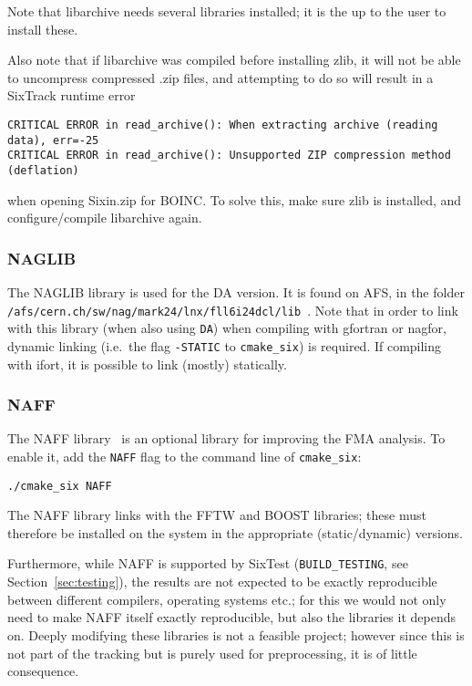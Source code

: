 \documentclass[english,BCOR=0mm,DIV=18]{scrartcl}
\begin{document}
Note that libarchive needs several libraries installed; it is the up to the user to install these.

Also note that if libarchive was compiled before installing zlib, it will not be able to uncompress compressed .zip files, and attempting to do so will result in a SixTrack runtime error
\begin{verbatim}
CRITICAL ERROR in read_archive(): When extracting archive (reading data), err=-25
CRITICAL ERROR in read_archive(): Unsupported ZIP compression method (deflation)
\end{verbatim}
when opening Sixin.zip for BOINC.
To solve this, make sure zlib is installed, and configure/compile libarchive again.

\subsubsection{NAGLIB}
\label{sec:building:libs:naglib}
The NAGLIB library  is used for the DA version.
It is found on AFS, in the folder \texttt{/afs/cern.ch/sw/nag/mark24/lnx/fll6i24dcl/lib}~.
Note that in order to link with this library (when also using \texttt{DA}) when compiling with gfortran or nagfor, dynamic linking (i.e.\ the flag \texttt{-STATIC} to \texttt{cmake\_six}) is required.
If compiling with ifort, it is possible to link (mostly) statically.

\subsubsection{NAFF}
\label{sec:building:libs:naff}
The NAFF library~\cite{NAFFpaper2} is an optional library for improving the FMA analysis.
To enable it, add the \texttt{NAFF} flag to the command line of \texttt{cmake\_six}:
\begin{lstlisting}
./cmake_six NAFF
\end{lstlisting}
The NAFF library links with the FFTW and BOOST libraries; these must therefore be installed on the system in the appropriate (static/dynamic) versions.

Furthermore, while NAFF is supported by SixTest (\texttt{BUILD\_TESTING}, see Section~\ref{sec:testing}), the results are not expected to be exactly reproducible between different compilers, operating systems etc.; for this we would not only need to make NAFF itself exactly reproducible, but also the libraries it depends on.
Deeply modifying these libraries is not a feasible project; however since this is not part of the tracking but is purely used for preprocessing, it is of little consequence. 
\end{document}
